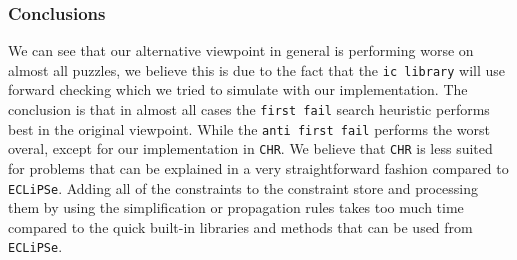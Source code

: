 \subsubsection{Conclusions}

We can see that our alternative viewpoint in general is performing worse on almost all puzzles, we believe this is due to the fact that the \texttt{ic library} will use forward checking which we tried to simulate with our implementation.
The conclusion is that in almost all cases the \texttt{first fail} search heuristic performs best in the original viewpoint. While the \texttt{anti first fail} performs the worst overal, except for our implementation in \texttt{CHR}.
We believe that \texttt{CHR} is less suited for problems that can be explained in a very straightforward fashion compared to \texttt{ECLiPSe}.
Adding all of the constraints to the constraint store and processing them by using the simplification or propagation rules takes too much time compared to the quick built-in libraries and methods that can be used from \texttt{ECLiPSe}.
 